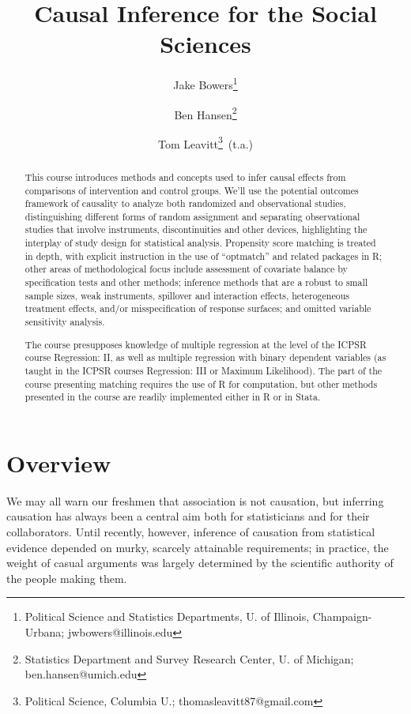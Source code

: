 \documentclass[12pt]{article}
\title{Causal Inference for the Social Sciences}
\author{ Jake Bowers\thanks{ Political Science and Statistics
    Departments, U. of Illinois, Champaign-Urbana; jwbowers@illinois.edu}
\and Ben Hansen\thanks{Statistics Department and Survey Research
  Center, U. of Michigan; ben.hansen@umich.edu} \and Tom
Leavitt\thanks{Political Science, Columbia U.; \mbox{thomasleavitt87@gmail.com}}\,  (t.a.)}
\begin{document}
\maketitle
\begin{abstract}
  This course introduces methods and concepts used to infer causal
  effects from comparisons of intervention and control groups.  We'll
  use the potential outcomes framework of causality to analyze both
  randomized and observational studies, distinguishing different forms
  of random assignment and separating observational studies that
  involve instruments, discontinuities and other devices, highlighting
  the interplay of study design for statistical analysis.  Propensity
  score matching is treated in depth, with explicit instruction in the
  use of ``optmatch'' and related packages in R; other areas of
  methodological focus include assessment of covariate balance by
  specification tests and other methods; inference methods that are a
  robust to small sample sizes, weak instruments, spillover and
  interaction effects, heterogeneous treatment effects, and/or
  misspecification of response surfaces; and omitted variable
  sensitivity
  analysis.  %

The course presupposes knowledge of multiple regression at the level
of the ICPSR course Regression: II, as well as multiple regression
with binary dependent variables (as taught in the ICPSR courses
Regression: III or Maximum Likelihood).  The part of the course presenting
matching requires the use of R for computation, but other methods presented in
the course are readily implemented either in R or in Stata.
\end{abstract}




\clearpage

\nobibliography*


\section{Overview}
We may all warn our freshmen that association is not causation, but inferring causation has always been a central aim both for statisticians and for their collaborators. Until recently, however, inference of causation from statistical evidence depended on murky, scarcely attainable requirements; in practice, the weight of casual arguments was largely determined by the scientific authority of the people making them.
\end{document}
